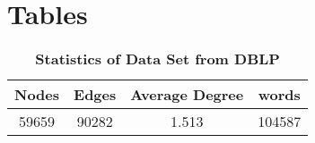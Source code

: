 \documentclass[10pt]{article}
\begin{document}
\section*{Tables}
%
%
%

\begin{table}[H]
\caption{\bf{Statistics of Data Set from DBLP}}
\label{tab:statdblp}
\centering
\begin{tabular}{|c|c|c|c|}\hline
Nodes&Edges&Average Degree&words\\\hline
59659 &90282 &1.513 &104587\\\hline
\end{tabular}
\end{table}

%
%
\end{document}
